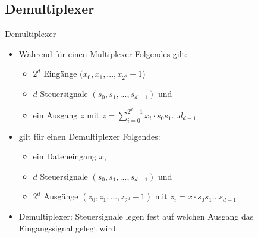 \documentclass[12pt%
,xcolor=table
,aspectratio=169%
]{beamer}
\begin{document}
\subsection{Demultiplexer}
\begin{frame}{Demultiplexer}
	\begin{itemize}
		\item Während für einen Multiplexer Folgendes gilt:
		\begin{itemize}
			\item $2^d$ Eingänge $(x_0 , x_1 , ..., x_{2^d} - 1$)
			\item $d$ Steuersignale $(s_0 , s_1 , ..., s_{d-1} )$ und
			\item ein Ausgang $z$ mit $z = \sum_{i=0}^{2^d-1} x_i \cdot s_0 s_1 \ldots d_{d-1}$
		\end{itemize}
		\item gilt für einen Demultiplexer Folgendes:
		\begin{itemize}
			\item ein Dateneingang $x$,
			\item $d$ Steuersignale $(s_0 , s_1 , ..., s_{d-1} )$ und
			\item $2^d$ Ausgänge $(z_0 , z_1 , ..., z_{2^d} -1 )$ mit $z_i = x \cdot s_0 s_1 ...s_{d-1}$
		\end{itemize}
		\item Demultiplexer: Steuersignale legen fest auf welchen Ausgang das Eingangssignal gelegt wird
	\end{itemize}
\end{frame}
\end{document}
